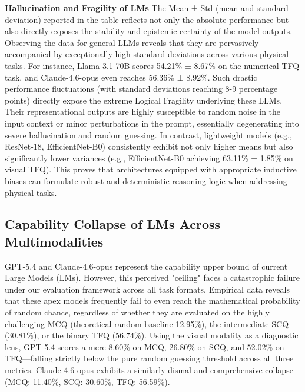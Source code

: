 \textbf{Hallucination and Fragility of LMs}
The Mean ± Std (mean and standard deviation) reported in the table reflects not only the absolute performance but also directly exposes the stability and epistemic certainty of the model outputs. Observing the data for general LLMs reveals that they are pervasively accompanied by exceptionally high standard deviations across various physical tasks. For instance, Llama-3.1 70B scores 54.21\% ± 8.67\% on the numerical TFQ task, and Claude-4.6-opus even reaches 56.36\% ± 8.92\%. Such drastic performance fluctuations (with standard deviations reaching 8-9 percentage points) directly expose the extreme Logical Fragility underlying these LLMs. Their representational outputs are highly susceptible to random noise in the input context or minor perturbations in the prompt, essentially degenerating into severe hallucination and random guessing. In contrast, lightweight models (e.g., ResNet-18, EfficientNet-B0) consistently exhibit not only higher means but also significantly lower variances (e.g., EfficientNet-B0 achieving 63.11\% ± 1.85\% on visual TFQ). This proves that architectures equipped with appropriate inductive biases can formulate robust and deterministic reasoning logic when addressing physical tasks.






\subsection{Capability Collapse of LMs Across Multimodalities}
GPT-5.4 and Claude-4.6-opus represent the capability upper bound of current Large Models (LMs). However, this perceived "ceiling" faces a catastrophic failure under our evaluation framework across all task formats. Empirical data reveals that these apex models frequently fail to even reach the mathematical probability of random chance, regardless of whether they are evaluated on the highly challenging MCQ (theoretical random baseline 12.95\%), the intermediate SCQ (30.81\%), or the binary TFQ (56.74\%). Using the visual modality as a diagnostic lens, GPT-5.4 scores a mere 8.60\% on MCQ, 26.80\% on SCQ, and 52.02\% on TFQ—falling strictly below the pure random guessing threshold across all three metrics. Claude-4.6-opus exhibits a similarly dismal and comprehensive collapse (MCQ: 11.40\%, SCQ: 30.60\%, TFQ: 56.59\%).


